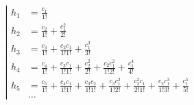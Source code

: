 \begin{equation*}
\left|
\begin{aligned} 
h_1 
&= \frac{c_1}{1!} \\ 
h_2 
&= \frac{c_2}{1!} 
+ \frac{c_1^2}{2!} \\
h_3 
&= \frac{c_3}{1!} 
+ \frac{c_2 c_1}{1!1!} 
+ \frac{c_1^3}{3!} \\
h_4 
&= \frac{c_4}{1!} 
+ \frac{c_3 c_1}{1!1!} 
+ \frac{c_2^2}{2!} 
+ \frac{c_2 c_1^2}{1!2!} 
+ \frac{c_1^4}{4!} \\
h_5
&= \frac{c_5}{1!}
+ \frac{c_4 c_1}{1!1!}
+ \frac{c_3 c_2}{1!1!}
+ \frac{c_3 c_1^2}{1!2!}
+ \frac{c_2^2 c_1}{2!1!}
+ \frac{c_2 c_1^3}{1!3!}
+ \frac{c_1^5}{5!} \\
&\ldots
\end{aligned}
\right.
\end{equation*}